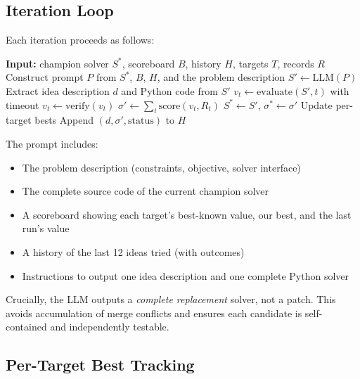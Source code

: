 \documentclass[11pt]{article}
\begin{document}
\subsection{Iteration Loop}

Each iteration proceeds as follows:

\begin{algorithm}[H]
\caption{Discovery Loop iteration}
\begin{algorithmic}[1]
\State \textbf{Input:} champion solver $S^*$, scoreboard $B$, history $H$, targets $T$, records $R$
\State Construct prompt $P$ from $S^*$, $B$, $H$, and the problem description
\State $S' \leftarrow \text{LLM}(P)$ 
\State Extract idea description $d$ and Python code from $S'$
  \State $v_t \leftarrow \text{evaluate}(S', t)$ with timeout
  \State $v_t \leftarrow \text{verify}(v_t)$ 
\EndFor
\State $\sigma' \leftarrow \sum_t \text{score}(v_t, R_t)$
  \State $S^* \leftarrow S'$, $\sigma^* \leftarrow \sigma'$ 
  \State Update per-target bests
\EndIf
\State Append $(d, \sigma', \text{status})$ to $H$
\end{algorithmic}
\end{algorithm}

The prompt includes:
\begin{itemize}
  \item The problem description (constraints, objective, solver interface)
  \item The complete source code of the current champion solver
  \item A scoreboard showing each target's best-known value, our best, and the last run's value
  \item A history of the last 12 ideas tried (with outcomes)
  \item Instructions to output one idea description and one complete Python solver
\end{itemize}

Crucially, the LLM outputs a \emph{complete replacement} solver, not a patch. This avoids
accumulation of merge conflicts and ensures each candidate is self-contained and independently
testable.

\subsection{Per-Target Best Tracking}
\end{document}
